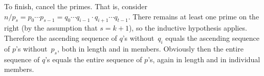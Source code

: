 \documentclass{ibl}  %
\begin{document}
\begin{problem}
\begin{exes}
\begin{answer}
  To finish, cancel the primes.
  That is, consider 
  $n/p_s=p_0\cdots p_{s-1}=q_0\cdots q_{i-1}\cdot q_{i+1}\cdots q_{t-1}$.
  There remains at least one prime on the right (by the assumption that 
  $s=k+1$), so the inductive hypothesis applies. 
  Therefore
  the ascending sequence of $q$'s without~$q_i$ 
  equals the ascending sequence of $p$'s without~$p_s$,
  both in length and in members. 
  Obviously then the entire sequence of $q$'s equals the entire sequence of
  $p$'s, again in length and in individual members.   
\end{answer}
\end{exes}




\end{problem}
\end{document}
